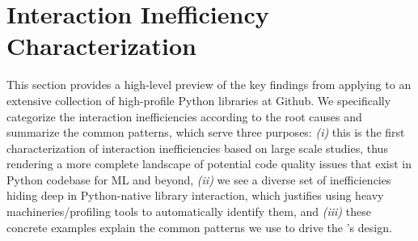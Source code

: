 \section{Interaction Inefficiency Characterization}
\label{characterization}

This section provides a high-level preview of the key findings from applying \tool to an extensive collection of high-profile Python libraries at Github. We specifically categorize the interaction inefficiencies according to the root causes and summarize the common patterns, which serve three purposes: \emph{(i)} this is the first characterization of interaction inefficiencies based on large scale studies, thus rendering a more complete landscape of potential code quality issues that exist in Python codebase for ML and beyond, \emph{(ii)} we see a diverse set of inefficiencies hiding deep in Python-native library interaction, which justifies using heavy machineries/profiling tools to automatically identify them, and \emph{(iii)} these concrete examples explain the common patterns we use to drive the \tool’s design. 








